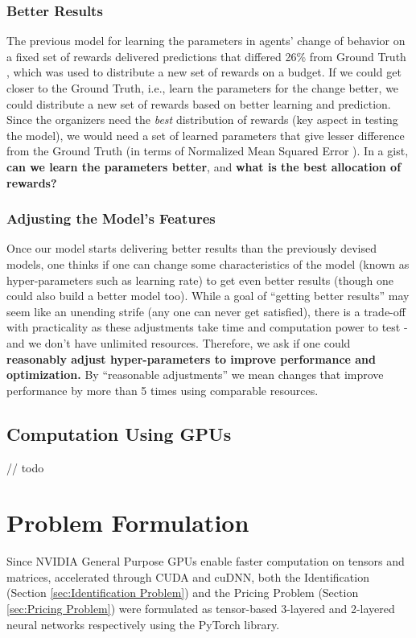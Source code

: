 \documentclass[12pt]{article}
\begin{document}
    \subsubsection{Better Results} \label{sec:Important Questions - Better Results}
    The previous model for learning the parameters in agents' change of behavior on a fixed set of rewards delivered predictions that differed 26\% from Ground Truth \cite[// todo]{Xue2016Avi2}, which was used to distribute a new set of rewards on a budget. If we could get closer to the Ground Truth, i.e., learn the parameters for the change better, we could distribute a new set of rewards based on better learning and prediction. Since the organizers need the \textit{best} distribution of rewards (key aspect in testing the model), we would need a set of learned parameters that give lesser difference from the Ground Truth (in terms of Normalized Mean Squared Error \cite[// todo]{Xue2016Avi2}). In a gist, \textbf{can we learn the parameters better}, and \textbf{what is the best allocation of rewards?}
    
    \subsubsection{Adjusting the Model's Features} \label{sec:Important Questions - Adjusting the Model's Features}
    Once our model starts delivering better results than the previously devised models, one thinks if one can change some characteristics of the model (known as hyper-parameters such as learning rate) to get even better results (though one could also build a better model too). While a goal of ``getting better results'' may seem like an unending strife (any one can never get satisfied), there is a trade-off with practicality as these adjustments take time and computation power to test - and we don't have unlimited resources. Therefore, we ask if one could \textbf{reasonably adjust hyper-parameters to improve performance and optimization.} By ``reasonable adjustments'' we mean changes that improve performance by more than 5 times using comparable resources.
    
    \subsection{Computation Using GPUs} \label{sec:Computation Using GPUs}
    // todo
    
    \blindtext
    
    \section{Problem Formulation} \label{sec:Problem Formulation}
    Since NVIDIA General Purpose GPUs enable faster computation on tensors and matrices, accelerated through CUDA and cuDNN, both the Identification (Section \ref{sec:Identification Problem}) and the Pricing Problem (Section \ref{sec:Pricing Problem}) were formulated as tensor-based 3-layered and 2-layered neural networks respectively using the PyTorch library.
    
\end{document}
